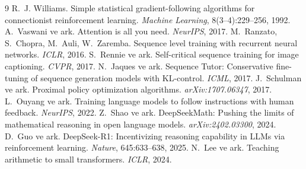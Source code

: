 \documentclass[10pt,twocolumn]{article}
\begin{document}
\begin{thebibliography}{9}
\small
{} R.~J. Williams. Simple statistical gradient-following algorithms for
connectionist reinforcement learning. \emph{Machine Learning}, 8(3--4):229--256, 1992.
 A.~Vaswani ve ark. Attention is all you need. \emph{NeurIPS}, 2017.
 M.~Ranzato, S.~Chopra, M.~Auli, W.~Zaremba. Sequence level training with
recurrent neural networks. \emph{ICLR}, 2016.
 S.~Rennie ve ark. Self-critical sequence training for image captioning.
\emph{CVPR}, 2017.
 N.~Jaques ve ark. Sequence Tutor: Conservative fine-tuning of sequence
generation models with KL-control. \emph{ICML}, 2017.
 J.~Schulman ve ark. Proximal policy optimization algorithms.
\emph{arXiv:1707.06347}, 2017.
 L.~Ouyang ve ark. Training language models to follow instructions with human
feedback. \emph{NeurIPS}, 2022.
 Z.~Shao ve ark. DeepSeekMath: Pushing the limits of mathematical reasoning in
open language models. \emph{arXiv:2402.03300}, 2024.
 D.~Guo ve ark. DeepSeek-R1: Incentivizing reasoning capability in LLMs via
reinforcement learning. \emph{Nature}, 645:633--638, 2025.
 N.~Lee ve ark. Teaching arithmetic to small transformers. \emph{ICLR}, 2024.
\end{thebibliography}
\end{document}
